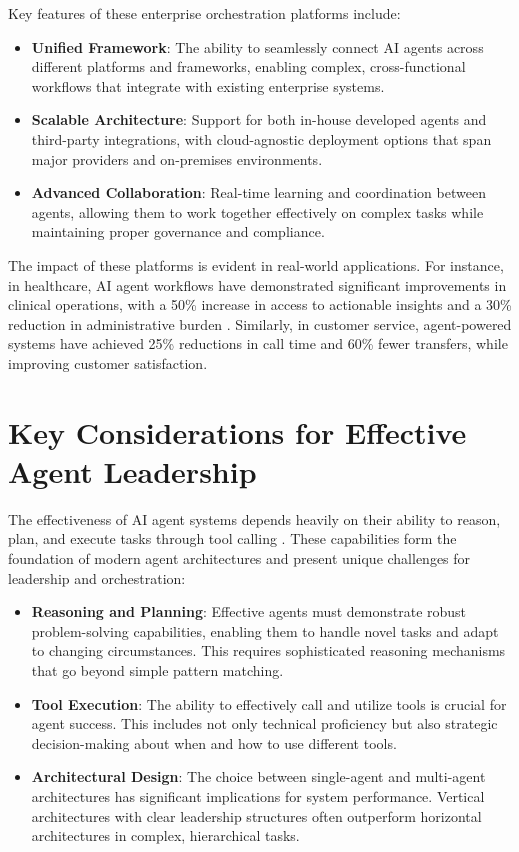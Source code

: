 \documentclass[conference]{IEEEtran}
\begin{document}
Key features of these enterprise orchestration platforms include:

\begin{itemize}
\item \textbf{Unified Framework}: The ability to seamlessly connect AI agents across different platforms and frameworks, enabling complex, cross-functional workflows that integrate with existing enterprise systems.
\item \textbf{Scalable Architecture}: Support for both in-house developed agents and third-party integrations, with cloud-agnostic deployment options that span major providers and on-premises environments.
\item \textbf{Advanced Collaboration}: Real-time learning and coordination between agents, allowing them to work together effectively on complex tasks while maintaining proper governance and compliance.
\end{itemize}

The impact of these platforms is evident in real-world applications. For instance, in healthcare, AI agent workflows have demonstrated significant improvements in clinical operations, with a 50\% increase in access to actionable insights and a 30\% reduction in administrative burden \cite{pwc2025agentos}. Similarly, in customer service, agent-powered systems have achieved 25\% reductions in call time and 60\% fewer transfers, while improving customer satisfaction.

\section{Key Considerations for Effective Agent Leadership}
The effectiveness of AI agent systems depends heavily on their ability to reason, plan, and execute tasks through tool calling \cite{masterman2024landscape}. These capabilities form the foundation of modern agent architectures and present unique challenges for leadership and orchestration:

\begin{itemize}
\item \textbf{Reasoning and Planning}: Effective agents must demonstrate robust problem-solving capabilities, enabling them to handle novel tasks and adapt to changing circumstances. This requires sophisticated reasoning mechanisms that go beyond simple pattern matching.
\item \textbf{Tool Execution}: The ability to effectively call and utilize tools is crucial for agent success. This includes not only technical proficiency but also strategic decision-making about when and how to use different tools.
\item \textbf{Architectural Design}: The choice between single-agent and multi-agent architectures has significant implications for system performance. Vertical architectures with clear leadership structures often outperform horizontal architectures in complex, hierarchical tasks.
\end{itemize}
\end{document}
